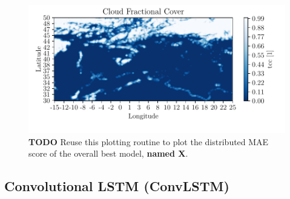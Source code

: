 \begin{figure}
    \centering
    \includegraphics{python_figs/example_artefact.pdf}
    \caption{\textbf{TODO} Reuse this plotting routine to plot the distributed MAE score of the overall best model, \textbf{named X}.}
    \label{fig:grid_mse_best_model}
\end{figure}

\begin{table}[hp]
    \centering
    \caption{Add the weights of the best model.}
    \label{tab:weights_best_model}
\end{table}

\subsection{Convolutional LSTM (ConvLSTM)}

